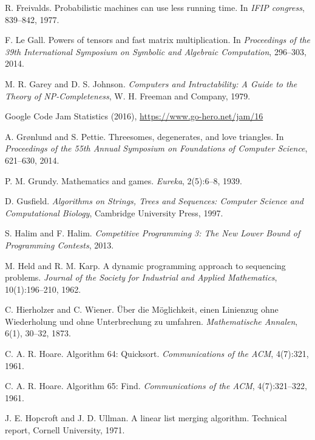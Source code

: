 \begin{thebibliography}{9}
  R. Freivalds.
  Probabilistic machines can use less running time.
  In \emph{IFIP congress}, 839--842, 1977.

  F. Le Gall.
  Powers of tensors and fast matrix multiplication.
  In \emph{Proceedings of the 39th International Symposium on Symbolic and Algebraic Computation},
  296--303, 2014.

  M. R. Garey and D. S. Johnson.
  \emph{Computers and Intractability:
  A Guide to the Theory of NP-Completeness},
  W. H. Freeman and Company, 1979.

  Google Code Jam Statistics (2016),
  \url{https://www.go-hero.net/jam/16}

  A. Grønlund and S. Pettie.
  Threesomes, degenerates, and love triangles.
  In \emph{Proceedings of the 55th Annual Symposium on Foundations of Computer Science},
  621--630, 2014.

  P. M. Grundy.
  Mathematics and games.
  \emph{Eureka}, 2(5):6--8, 1939.

  D. Gusfield.
  \emph{Algorithms on Strings, Trees and Sequences:
  Computer Science and Computational Biology},
  Cambridge University Press, 1997.


  S. Halim and F. Halim.
  \emph{Competitive Programming 3: The New Lower Bound of Programming Contests}, 2013.

  M. Held and R. M. Karp.
  A dynamic programming approach to sequencing problems.
  \emph{Journal of the Society for Industrial and Applied Mathematics}, 10(1):196--210, 1962.

  C. Hierholzer and C. Wiener.
  Über die Möglichkeit, einen Linienzug ohne Wiederholung und ohne Unterbrechung zu umfahren.
  \emph{Mathematische Annalen}, 6(1), 30--32, 1873.

  C. A. R. Hoare.
  Algorithm 64: Quicksort.
  \emph{Communications of the ACM}, 4(7):321, 1961.

  C. A. R. Hoare.
  Algorithm 65: Find.
  \emph{Communications of the ACM}, 4(7):321--322, 1961.

  J. E. Hopcroft and J. D. Ullman.
  A linear list merging algorithm.
  Technical report, Cornell University, 1971.


\end{thebibliography}
